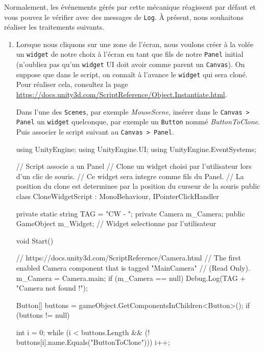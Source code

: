 \documentclass[a4paper,10pt]{article}
\newenvironment{solution}%
{\begin{tcolorbox}[breakable,colback=red!5!white,colframe=red!75!black,title=Solution]}%
{\end{tcolorbox}}
\newenvironment{boxcode}%
{\begin{tcolorbox}[breakable,colback=gray!5!white,colframe=black]}%
	{\end{tcolorbox}}
\begin{document}
Normalement, les événements gérés par cette mécanique réagissent par défaut et vous pouvez le vérifier avec des messages de \texttt{Log}. À présent, nous souhaitons réaliser les traitements suivants.
\begin{enumerate}
	\item  Lorsque nous cliquons sur une zone de l'écran, nous voulons créer à la volée un \texttt{widget} de notre choix à l'écran en tant que fils de notre \texttt{Panel} initial (n'oubliez pas qu'un \texttt{widget} UI doit avoir comme parent un \texttt{Canvas}). On suppose que dans le script, on connaît à l'avance le \texttt{widget} qui sera cloné.
	Pour réaliser cela, consultez  la page \url{https://docs.unity3d.com/ScriptReference/Object.Instantiate.html}. \\	
	
	
\ifversionenseignant
\begin{solution}
Dans l'une des \texttt{Scenes}, par exemple \textit{MouseScene}, insérer dans le \texttt{Canvas > Panel} un \texttt{widget} quelconque, par exemple un \texttt{Button} nommé \textit{ButtonToClone}.	\\

Puis associer le script suivant au \texttt{Canvas > Panel}.

\begin{boxcode}
\begin{csharpsansbord}
using UnityEngine;
using UnityEngine.UI;
using UnityEngine.EventSystems;

// Script associe a un Panel
// Clone un widget choisi par l'utilisateur lors d'un clic de souris.
// Ce widget sera integre comme fils du Panel.
// La position du clone est determinee par la position du curseur de la souris 
public class CloneWidgetScript : MonoBehaviour, IPointerClickHandler
{
	private static string TAG = "CW - ";
	private Camera m_Camera;
	public GameObject m_Widget; // Widget selectionne par l'utilisateur
	
	void Start() {
		// https://docs.unity3d.com/ScriptReference/Camera.html
		// The first enabled Camera component that is tagged "MainCamera"
		//  (Read Only).
		m_Camera = Camera.main;
		if (m_Camera == null) {	Debug.Log(TAG + "Camera not found !");	}
		
		Button[] buttons = gameObject.GetComponentsInChildren<Button>();
		if (buttons != null) {
			int i = 0;
			while (i < buttons.Length &&
			(! buttons[i].name.Equals("ButtonToClone"))) { i++;	}
			
}}}
\end{csharpsansbord}
\end{boxcode}
\end{solution}
\end{enumerate}
\end{document}
